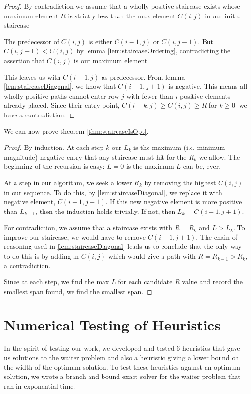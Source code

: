 \documentclass[11pt,twocolumn]{article}
\begin{document}
\begin{proof}
By contradiction we assume that a wholly positive staircase exists whose maximum element $R$ is strictly less than the max element $C(i,j)$ in our initial staircase.

The predecessor of $C(i,j)$ is either $C(i-1,j)$ or $C(i,j-1)$.  But $C(i,j-1) < C(i,j)$ by lemma \ref{lem:staircaseOrdering}, contradicting the assertion that $C(i,j)$ is our maximum element.  

This leaves us with $C(i-1,j)$ as predecessor.  From lemma \ref{lem:staircaseDiagonal}, we know that $C(i-1,j+1)$ is negative. This means all wholly positive paths cannot enter row $j$ with fewer than $i$ positive elements already placed.  Since their entry point, $C(i+k,j) \geq C(i,j) \geq R$ for $k \geq 0$, we have a contradiction.
\end{proof}

We can now prove theorem \ref{thm:staircaseIsOpt}.

\begin{proof}
By induction. At each step $k$ our $L_k$ is the maximum (i.e. minimum magnitude) negative entry that any staircase must hit for the $R_k$ we allow.  The beginning of the recursion is easy: $L=0$ is the maximum $L$ can be, ever.  

At a step in our algorithm, we seek a lower $R_k$ by removing the highest $C(i,j)$ in our sequence.  To do this, by \ref{lem:staircaseDiagonal}, we replace it with negative element, $C(i-1,j+1)$. If this new negative element is more positive than $L_{k-1}$, then the induction holds trivially.  If not, then $L_k = C(i-1,j+1)$.  

For contradiction, we assume that a staircase exists with $R = R_k$ and $L > L_k$. To improve our staircase, we would have to remove $C(i-1,j+1)$.  The chain of reasoning used in \ref{lem:staircaseDiagonal} leads us to conclude that the only way to do this is by adding in $C(i,j)$ which would give a path with $R = R_{k-1} > R_k$, a contradiction.

Since at each step, we find the max $L$ for each candidate $R$ value and record the smallest span found, we find the smallest span.
\end{proof}

\section{Numerical Testing of Heuristics}

In the spirit of testing our work, we developed and tested 6 heuristics that gave us solutions to the waiter problem and also a heuristic giving a lower bound on the width of the optimum solution.  To test these heuristics against an optimum solution, we wrote a branch and bound exact solver for the waiter problem that ran in exponential time.
\end{document}
